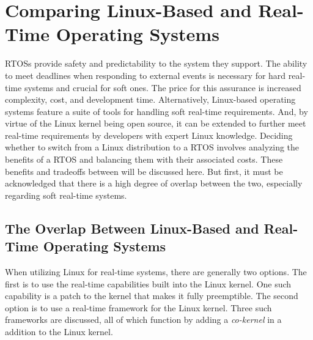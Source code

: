 \markboth{}{}
\section{\sloppy Comparing Linux-Based and Real-Time Operating Systems}
\markboth{}{}
    RTOSs provide safety and predictability to the system they support.
    The ability to meet deadlines when responding to external events is
        necessary for hard real-time systems and crucial for soft ones.
    The price for this assurance is increased complexity, cost, and development
        time.
    Alternatively, Linux-based operating systems feature a suite of tools for
        handling soft real-time requirements.
    And, by virtue of the Linux kernel being open source, it can be extended to
        further meet real-time requirements by developers with expert Linux
        knowledge.
    Deciding whether to switch from a Linux distribution to a RTOS involves
        analyzing the benefits of a RTOS and balancing them with their
        associated costs.
    These benefits and tradeoffs between will be discussed here.
    But first, it must be acknowledged that there is a high degree of overlap
        between the two, especially regarding soft real-time systems.

        \markboth{}{}
        \subsection{The Overlap Between Linux-Based and Real-Time Operating Systems}
        \markboth{}{}
            When utilizing Linux for real-time systems, there are generally two
                options.
            The first is to use the real-time capabilities built into the Linux
                kernel.
            One such capability is a patch to the kernel that makes it fully
                preemptible.
            The second option is to use a real-time framework for the Linux
                kernel.
            Three such frameworks are discussed, all of which function by adding
                a \textit{co-kernel} in a addition to the Linux kernel.

